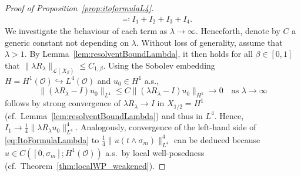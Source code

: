 \documentclass[reqno]{amsart}
\newcommand{\sL}{\mathscr{L}}
\newcommand{\sO}{\mathscr{O}}
\newcommand{\ec}{\eqqcolon}
\newcommand{\hra}{\hookrightarrow}
\newcommand{\1}{\mathbf{1}}
\begin{document}
\begin{proof}[Proof of Proposition~\ref{prop:itoformulaL4}]
\begin{align}
      &\ec I_1+I_2+I_3+I_4.
    \end{align}
    We investigate the behaviour of each term as $\lambda \to \infty$. Henceforth, denote by $C$ a generic constant not depending on $\lambda$.
    Without loss of generality, assume that $\lambda >1$. By Lemma~\ref{lem:resolventBoundLambda}, it then holds for all $\beta \in [0,1]$ that $\|\lambda R_\lambda\|_{\sL(X_\beta)}\le C_{1,\beta}$.
    Using the Sobolev embedding $H=H^1(\sO) \hra L^4(\sO)$ and $u_0\in H^1$ a.s.,
\begin{equation*}
   \|(\lambda R_\lambda - I) u_0\|_{L^4} \le  C \|(\lambda R_\lambda - I) u_0\|_{H^1}  \to 0 \quad \text{as } \lambda \to\infty
\end{equation*}
follows by strong convergence of $\lambda R_\lambda \to I$ in $X_{1/2}=H^1$ (cf.\ Lemma~\ref{lem:resolventBoundLambda}) and thus in $L^4$. Hence, $I_1 \to \frac{1}{4}\|\lambda R_\lambda u_0\|_{L^4}^4$. Analogously, convergence of the left-hand side of \eqref{eq:ItoFormulaLambda} to $\frac{1}{4}\|u(t\land \sigma_m)\|_{L^4}^4$ can be deduced because $u\in C([0,\sigma_m];H^1(\sO))$ a.s.\ by local well-posedness (cf.\ Theorem~\ref{thm:localWP_weakened}). 



\end{proof}
\end{document}

